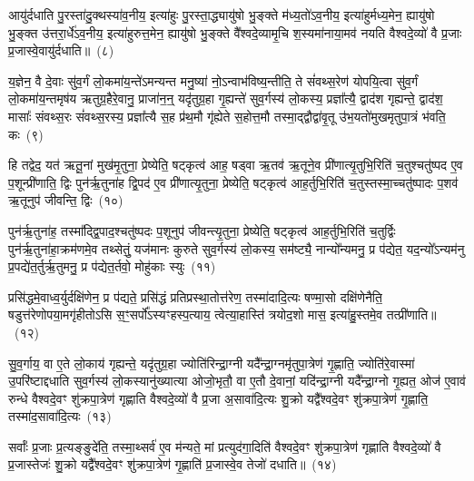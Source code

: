 आयु॑र्दधाति पु॒रस्ता॑दु॒क्थस्या॑व॒नीय॒ इत्या॑हुः पु॒रस्ता॒द्ध्यायु॑षो भु॒ङ्क्ते म॑ध्य॒तो॑\-ऽव॒नीय॒ इत्या॑हुर्मध्य॒मेन॒ ह्यायु॑षो भु॒ङ्क्त उ॑त्तरा॒र्धे॑\-ऽव॒नीय॒ इत्या॑हुरुत्त॒मेन॒ ह्यायु॑षो भु॒ङ्क्ते वै᳚श्वदे॒व्यामृ॒चि श॒स्यमा॑नाया॒मव॑ नयति वैश्वदे॒व्यो॑ वै प्र॒जाः प्र॒जास्वे॒वायु॑र्दधाति॥~(८)\ip

{\anuvakamend[{ध्रु॒वस्तस्मा॑दे॒व य॒ज्ञस्यैका॒न्नच॑त्वारि॒ꣳ॒शच्च॑}]}

य॒ज्ञेन॒ वै दे॒वाः सु॑व॒र्गं लो॒कमा॑य॒न्ते॑\-ऽमन्यन्त मनु॒ष्या॑ नो॒\-ऽन्वाभ॑विष्य॒न्तीति॒ ते सं॑वथ्स॒रेण॑ योपयि॒त्वा सु॑व॒र्गं लो॒कमा॑य॒न्तमृष॑य ऋतुग्र॒हैरे॒वानु॒ प्राजा॑न॒न्॒ यदृ॑तुग्र॒हा गृ॒ह्यन्ते॑ सुव॒र्गस्य॑ लो॒कस्य॒ प्रज्ञा᳚त्यै॒ द्वाद॑श गृह्यन्ते॒ द्वाद॑श॒ मासाः᳚ संवथ्स॒रः सं॑वथ्स॒रस्य॒ प्रज्ञा᳚त्यै स॒ह प्र॑थ॒मौ गृ॑ह्येते स॒होत्त॒मौ तस्मा॒द्द्वौद्वा॑वृ॒तू उ॑भ॒यतो॑मुखमृतुपा॒त्रं भ॑वति॒ कः~(९)\ip

हि तद्वेद॒ यत॑ ऋतू॒नां मुख॑मृ॒तुना॒ प्रेष्येति॒ षट्कृत्व॑ आह॒ षड्वा ऋ॒तव॑ ऋ॒तूने॒व प्री॑णात्यृ॒तुभि॒रिति॑ च॒तुश्चतु॑ष्पद ए॒व प॒शून्प्री॑णाति॒ द्विः पुन॑र्\mbox{}ऋ॒तुना॑ह द्वि॒पद॑ ए॒व प्री॑णात्यृ॒तुना॒ प्रेष्येति॒ षट्कृत्व॑ आह॒र्तुभि॒रिति॑ च॒तुस्तस्मा॒च्चतु॑ष्पादः प॒शव॑ ऋ॒तूनुप॑ जीवन्ति॒ द्विः~(१०)\ip

पुन॑र्\mbox{}ऋ॒तुना॑ह॒ तस्मा᳚द्\-द्वि॒पाद॒श्चतु॑ष्पदः प॒शूनुप॑ जीवन्त्यृ॒तुना॒ प्रेष्येति॒ षट्कृत्व॑ आह॒र्तुभि॒रिति॑ च॒तुर्द्विः पुन॑र्\mbox{}ऋ॒तुना॑हा॒क्रम॑णमे॒व तथ्सेतुं॒ यज॑मानः कुरुते सुव॒र्गस्य॑ लो॒कस्य॒ सम॑ष्ट्यै॒ नान्यो᳚न्यमनु॒ प्र प॑द्येत॒ यद॒न्यो᳚\-ऽन्यम॑नु प्र॒पद्ये॑त॒र्तुर्\mbox{}ऋ॒तुमनु॒ प्र प॑द्येत॒र्तवो॒ मोहु॑काः स्युः~(११)\ip

प्रसि॑द्धमे॒वाध्व॒र्युर्दक्षि॑णेन॒ प्र प॑द्यते॒ प्रसि॑द्धं प्रतिप्रस्था॒तोत्त॑रेण॒ तस्मा॑दादि॒त्यः षण्मा॒सो दक्षि॑णेनैति॒ षडुत्त॑रेणोपया॒मगृ॑हीतो\-ऽसि स॒ꣳ॒सर्पो᳚\-ऽस्यꣳहस्प॒त्याय॒ त्वेत्या॒हास्ति॑ त्रयोद॒शो मास॒ इत्या॑हु॒स्तमे॒व तत्प्री॑णाति॥~(१२)\ip

{\anuvakamend[{को जी॑वन्ति॒ द्विः स्यु॒श्चतु॑स्त्रिꣳशच्च}]}

सु॒व॒र्गाय॒ वा ए॒ते लो॒काय॑ गृह्यन्ते॒ यदृ॑तुग्र॒हा ज्योति॑रिन्द्रा॒ग्नी यदै᳚न्द्रा॒ग्नमृ॑तुपा॒त्रेण॑ गृ॒ह्णाति॒ ज्योति॑रे॒वास्मा॑ उ॒परि॑ष्टाद्दधाति सुव॒र्गस्य॑ लो॒कस्यानु॑ख्यात्या ओजो॒भृतौ॒ वा ए॒तौ दे॒वानां॒ यदि॑न्द्रा॒ग्नी यदै᳚न्द्रा॒ग्नो गृ॒ह्यत॒ ओज॑ ए॒वाव॑ रुन्धे वैश्वदे॒वꣳ शु॑क्रपा॒त्रेण॑ गृह्णाति वैश्वदे॒व्यो॑ वै प्र॒जा अ॒सावा॑दि॒त्यः शु॒क्रो यद्वै᳚श्वदे॒वꣳ शु॑क्रपा॒त्रेण॑ गृ॒ह्णाति॒ तस्मा॑द॒सावा॑दि॒त्यः~(१३)\ip

सर्वाः᳚ प्र॒जाः प्र॒त्यङ्ङुदे॑ति॒ तस्मा॒थ्सर्व॑ ए॒व म॑न्यते॒ मां प्रत्युद॑गा॒दिति॑ वैश्वदे॒वꣳ शु॑क्रपा॒त्रेण॑ गृह्णाति वैश्वदे॒व्यो॑ वै प्र॒जास्तेजः॑ शु॒क्रो यद्वै᳚श्वदे॒वꣳ शु॑क्रपा॒त्रेण॑ गृ॒ह्णाति॑ प्र॒जास्वे॒व तेजो॑ दधाति॥~(१४)\ip

